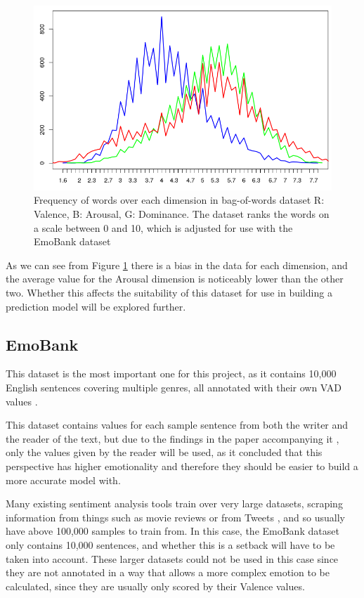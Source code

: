 \begin{figure}[h]
\centering
\includegraphics[scale=0.4]{graphs/lexiconDist.png}
\caption{Frequency of words over each dimension in bag-of-words dataset R: Valence, B: Arousal, G: Dominance. The dataset ranks the words on a scale between 0 and 10, which is adjusted for use with the EmoBank dataset}
\label{lexiconGraph}
\end{figure}

As we can see from Figure \ref{lexiconGraph} there is a bias in the data for each dimension, and the average value for the Arousal dimension is noticeably lower than the other two. Whether this affects the suitability of this dataset for use in building a prediction model will be explored further.

\subsection{EmoBank}
This dataset is the most important one for this project, as it contains 10,000 English sentences covering multiple genres, all annotated with their own VAD values \cite{emoBank}.

This dataset contains values for each sample sentence from both the writer and the reader of the text, but due to the findings in the paper accompanying it \cite{emoBank}, only the values given by the reader will be used, as it concluded that this perspective has higher emotionality and therefore they should be easier to build a more accurate model with.

Many existing sentiment analysis tools train over very large datasets, scraping information from things such as movie reviews \cite{socher2013recursive} or from Tweets \cite{towardsDS}, and so usually have above 100,000 samples to train from. In this case, the EmoBank dataset only contains 10,000 sentences, and whether this is a setback will have to be taken into account. These larger datasets could not be used in this case since they are not annotated in a way that allows a more complex emotion to be calculated, since they are usually only scored by their Valence values. 

